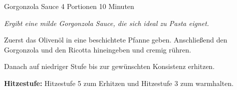 \begin{recipe}{Gorgonzola Sauce} {4 Portionen} {10 Minuten}

  \freeform
  \textit{Ergibt eine milde Gorgonzola Sauce, die sich ideal zu Pasta eignet.}
  
  
  Zuerst das Olivenöl in eine beschichtete Pfanne geben.
  Anschließend den Gorgonzola und den Ricotta hineingeben und cremig rühren.

  \newstep
  Danach auf niedriger Stufe bis zur gewünschten Konsistenz erhitzen.
  
  \freeform
  \hrulefill
  
  \freeform
  \textbf{Hitzestufe:}
  Hitzestufe 5 zum Erhitzen und Hitzestufe 3 zum warmhalten.
  
  \end{recipe}
  
